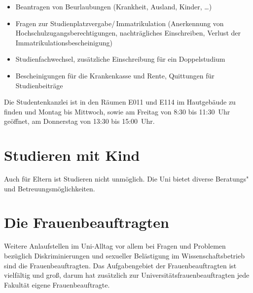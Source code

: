 \begin{itemize}
\item Beantragen von Beurlaubungen (Krankheit, Ausland, Kinder, \ldots)
\item Fragen zur Studienplatzvergabe/\,Immatrikulation (Anerkennung von Hochschulzugangsberechtigungen, nachträgliches Einschreiben, Verlust der Immatrikulationsbescheinigung)
\item Studienfachwechsel, zusätzliche Einschreibung für ein Doppelstudium
\item Bescheinigungen für die Krankenkasse und Rente, Quittungen für Studienbeiträge
\end{itemize}

Die Studentenkanzlei ist in den Räumen E011 und E114 im Hautgebäude zu finden und Montag bis Mittwoch, sowie am Freitag von 8:30 bis 11:30~Uhr geöffnet, am Donnerstag von 13:30 bis 15:00~Uhr.

\begin{urlList}
\end{urlList}


\section{Studieren mit Kind}

Auch für Eltern ist Studieren nicht unmöglich. Die Uni bietet diverse Beratungs"~ und Betreuungsmöglichkeiten.

\begin{urlList}
\end{urlList}

%

\section{Die Frauenbeauftragten}
Weitere Anlaufstellen im Uni-Alltag vor allem bei Fragen und Problemen bezüglich Diskriminierungen und sexueller Belästigung im Wissenschaftsbetrieb sind die Frauenbeauftragten.
Das Aufgabengebiet der Frauenbeauftragten ist vielfältig und groß, darum hat zusätzlich zur Universitätsfrauenbeauftragten jede Fakultät eigene Frauenbeauftragte.

